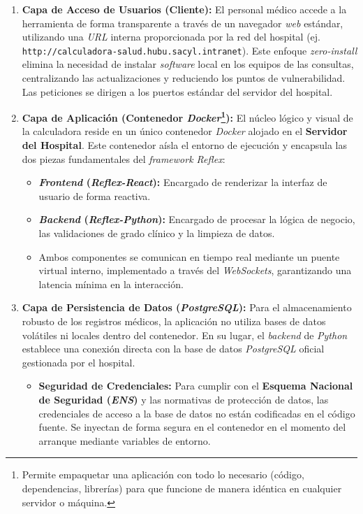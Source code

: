 \begin{enumerate}
	\item \textbf{Capa de Acceso de Usuarios (Cliente):} El personal médico accede a la herramienta de forma transparente a través de un navegador \textit{web} estándar, utilizando una \textit{URL} interna proporcionada por la red del hospital (ej. \texttt{http://calculadora-salud.hubu.sacyl.intranet}). Este enfoque \textit{zero-install} elimina la necesidad de instalar \textit{software} local en los equipos de las consultas, centralizando las actualizaciones y reduciendo los puntos de vulnerabilidad. Las peticiones se dirigen a los puertos estándar del servidor del hospital.
	
	\item \textbf{Capa de Aplicación (Contenedor \textit{Docker}\footnote{Permite empaquetar una aplicación con todo lo necesario (código, dependencias, librerías) para que funcione de manera idéntica en cualquier servidor o máquina.}):} El núcleo lógico y visual de la calculadora reside en un único contenedor \textit{Docker} alojado en el \textbf{Servidor del Hospital}. Este contenedor aísla el entorno de ejecución y encapsula las dos piezas fundamentales del \textit{framework Reflex}:
	\begin{itemize}
		\item \textbf{\textit{Frontend} (\textit{Reflex-React}):} Encargado de renderizar la interfaz de usuario de forma reactiva.
		\item \textbf{\textit{Backend} (\textit{Reflex-Python}):} Encargado de procesar la lógica de negocio, las validaciones de grado clínico y la limpieza de datos.
		\item Ambos componentes se comunican en tiempo real mediante un puente virtual interno, implementado a través del \textit{WebSockets}, garantizando una latencia mínima en la interacción.
	\end{itemize}
	
	\item \textbf{Capa de Persistencia de Datos (\textit{PostgreSQL}):} Para el almacenamiento robusto de los registros médicos, la aplicación no utiliza bases de datos volátiles ni locales dentro del contenedor. En su lugar, el \textit{backend} de \textit{Python} establece una conexión directa con la base de datos \textit{PostgreSQL} oficial gestionada por el hospital.
	\begin{itemize}
		\item \textbf{Seguridad de Credenciales:} Para cumplir con el\textbf{ Esquema Nacional de Seguridad (\textit{ENS})} \cite{ens} y las normativas de protección de datos, las credenciales de acceso a la base de datos no están codificadas en el código fuente. Se inyectan de forma segura en el contenedor en el momento del arranque mediante variables de entorno.
		

\end{itemize}
\end{enumerate}
